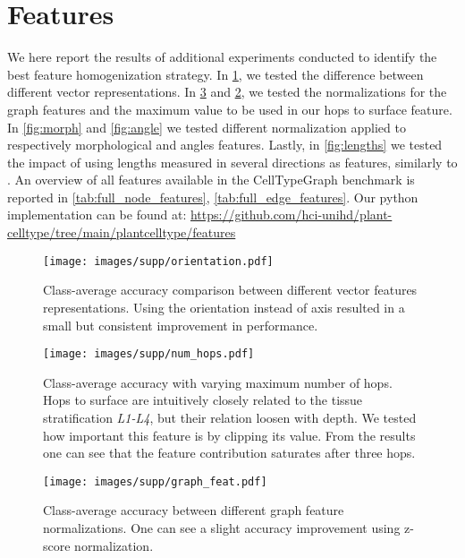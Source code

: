 \documentclass[10pt,twocolumn,letterpaper]{article}
\begin{document}
\section{Features}
\label{suppl:sec3}
We here report the results of additional experiments conducted to identify the best feature homogenization strategy. In \cref{fig:orientation}, we tested the difference between different vector representations. In \cref{fig:graph} and  \cref{fig:hops}, we tested the normalizations for the graph features and the maximum value to be used in our hops to surface feature. In \cref{fig:morph} and \cref{fig:angle} we tested different normalization applied to respectively morphological and angles features. Lastly, in \cref{fig:lengths} we tested the impact of using lengths measured in several directions as features, similarly to \cite{schmidt2014irocs}.
An overview of all features available in the CellTypeGraph benchmark is reported in \cref{tab:full_node_features}, \cref{tab:full_edge_features}. Our python implementation can be found at: \url{https://github.com/hci-unihd/plant-celltype/tree/main/plantcelltype/features}

\begin{figure}
  \centering
  \texttt{[image: images/supp/orientation.pdf]}
  \caption{Class-average accuracy comparison between different vector features representations. Using the orientation instead of axis resulted in a small but consistent improvement in performance.}
  \label{fig:orientation}
\end{figure}

\begin{figure}
  \centering
  \texttt{[image: images/supp/num\_hops.pdf]}
  \caption{Class-average accuracy with varying maximum number of hops. Hops to surface are intuitively closely related to the tissue stratification \textit{L1-L4}, but their relation loosen with depth. We tested how important this feature is by clipping its value. From the results one can see that the feature contribution saturates after three hops.}
  \label{fig:hops}
\end{figure}

\begin{figure}
  \centering
  \texttt{[image: images/supp/graph\_feat.pdf]}
  \caption{Class-average accuracy between different graph feature normalizations. One can see a slight accuracy improvement using z-score normalization.}
  \label{fig:graph}
\end{figure}
\end{document}
